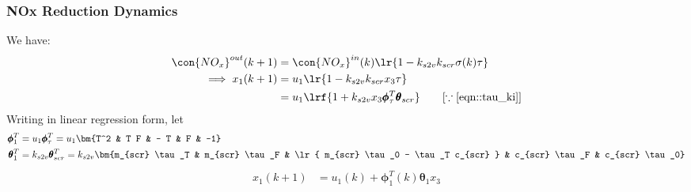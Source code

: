 \subsubsection{NOx Reduction Dynamics}
We have:
\begin{align*}
    \con{NO_x}^{out} (k + 1) &= \con{NO_x}^{in} (k) \lr{1 - k_{s2v} k_{scr} \sigma(k) \tau}\\
    \implies x_1 (k+1) &= u_1 \lr{1 - k_{s2v} k_{scr} x_3 \tau}\\
                       &= u_1 \lrf{1 + k_{s2v} x_3 \pmb \phi_\tau^T \pmb \theta_{scr}} \qquad [\because \ref{eqn::tau_ki}]
\end{align*}
Writing in linear regression form, let
\begin{align*}
    \pmb \phi_1^T &= u_1 \pmb \phi_\tau^T = u_1 \bm{T^2 &  T F & - T &  F & -1} \\
    \pmb \theta_1^T &= k_{s2v} \pmb \theta_{scr}^T = k_{s2v} \bm{m_{scr} \tau_T &
                                                               m_{scr} \tau_F &
                                                               \lr{ m_{scr} \tau_0  -  \tau_T c_{scr} } &
                                                               c_{scr} \tau_F &
                                                               c_{scr} \tau_0}
\end{align*}
\begin{align}
    x_1(k+1) &= u_1(k) + \pmb \phi_1^T (k) \pmb \theta_1 x_3  \label{eqn::nox_regression}
\end{align}















